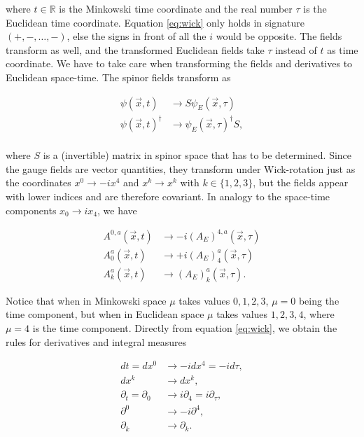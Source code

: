 \documentclass{article}
\theoremstyle{plain} %
\theoremstyle{convention} %
\theoremstyle{remark} %
\numberwithin{equation}{section}
\begin{document}
where $t \in \mathbb{R}$ is the Minkowski time coordinate and the real number $\tau$ is the Euclidean time coordinate. Equation \eqref{eq:wick} only holds in signature $(+,-,\dots,-)$, else the signs in front of all the $i$ would be opposite. The fields transform as well, and the transformed Euclidean fields take $\tau$ instead of $t$ as time coordinate. We have to take care when transforming the fields and derivatives to Euclidean space-time. The spinor fields transform as

\begin{align*}
    \psi(\vec{x}, t) &\longrightarrow S \psi_E(\vec{x}, \tau) \\
    \psi(\vec{x}, t)^{\dagger} &\longrightarrow \psi_E(\vec{x}, \tau)^{\dagger} S, \\
\end{align*}

where $S$ is a (invertible) matrix in spinor space that has to be determined. Since the gauge fields are vector quantities, they transform under Wick-rotation just as the coordinates $x^0 \to -ix^4$ and $x^k \to x^k$ with $k \in \{1, 2, 3\}$, but the fields appear with lower indices and are therefore covariant. In analogy to the space-time components $x_0 \to ix_4$, we have

\begin{align*}
    A^{0,a}(\vec{x}, t) &\longrightarrow - i (A_E)^{4,a}(\vec{x}, \tau) \\
    A_0^a(\vec{x}, t)   &\longrightarrow + i (A_E)_4^a(\vec{x}, \tau) \\
    A_k^a(\vec{x}, t)   &\longrightarrow (A_E)_k^a(\vec{x}, \tau).
\end{align*}

Notice that when in Minkowski space $\mu$ takes values $0, 1, 2, 3$, $\mu = 0$ being the time component, but when in Euclidean space $\mu$ takes values $1, 2, 3, 4$, where $\mu = 4$ is the time component. Directly from equation \eqref{eq:wick}, we obtain the rules for derivatives and integral measures

\begin{align*}
    dt = dx^0 &\longrightarrow - i d x^4 = - i d \tau, \\
    dx^k &\longrightarrow dx^k, \\
    \partial_t = \partial_0 &\longrightarrow i \partial_4 = i \partial_{\tau}, \\
    \partial^0 &\longrightarrow - i \partial^4, \\
    \partial_k &\longrightarrow \partial_k.
\end{align*}
\end{document}
